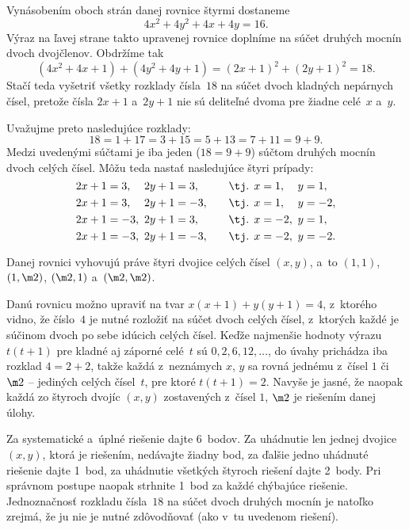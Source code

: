 {%
Vynásobením oboch strán danej rovnice štyrmi dostaneme
$$
4x^2+4y^2+4x+4y=16.
$$
Výraz na ľavej strane takto upravenej rovnice doplníme na súčet druhých
mocnín dvoch dvojčlenov. Obdržíme tak
$$
(4x^2+4x+1)+(4y^2+4y+1)=(2x+1)^2+(2y+1)^2=18.
$$
Stačí teda vyšetriť všetky rozklady čísla~$18$
na súčet dvoch kladných nepárnych čísel, pretože čísla $2x+1$ a~$2y+1$
nie sú deliteľné dvoma pre žiadne celé~$x$ a~$y$.

Uvažujme preto nasledujúce rozklady:
$$
18=1+17=3+15=5+13=7+11=9+9.
$$
Medzi uvedenými súčtami je iba jeden ($18=9+9$) súčtom druhých
mocnín dvoch celých čísel. Môžu teda nastať nasledujúce štyri prípady:
$$
\vcenter{\openup\jot\let\\=\cr
\halign{&$#$\hss\cr
2x+1=3, \enspace &2y+1=3,  \qquad&\text{\tj. }x=1, \enspace &y=1,\\
2x+1=3, \enspace &2y+1=-3, \qquad&\text{\tj. }x=1, \enspace &y=-2,\\
2x+1=-3,\enspace &2y+1=3,  \qquad&\text{\tj. }x=-2,\enspace &y=1,\\
2x+1=-3,\enspace &2y+1=-3, \qquad&\text{\tj. }x=-2,\enspace &y=-2.\\
}}
$$

\zaver
Danej rovnici vyhovujú práve štyri dvojice celých čísel $(x,y)$,
a~to $(1,1)$, $(1,\m2)$, $(\m2,1)$ a~$(\m2,\m2)$.

\ineriesenie
Danú rovnicu možno upraviť na tvar $x(x+1)+y(y+1)=4$, z~ktorého vidno, že číslo~$4$
je nutné rozložiť na súčet dvoch celých čísel, z~ktorých každé je
súčinom dvoch po sebe idúcich celých čísel.
Keďže najmenšie hodnoty výrazu $t(t+1)$ pre kladné aj záporné celé~$t$
sú $0, 2, 6, 12,\dots$, do úvahy prichádza iba rozklad $4=2+2$, takže každá
z~neznámych $x$, $y$ sa rovná jednému z~čísel $1$ či $\m2$ -- jediných celých
čísel~$t$, pre ktoré $t(t+1)=2$. Navyše je jasné, že naopak každá zo štyroch
dvojíc $(x,y)$ zostavených z~čísel $1$, $\m2$ je riešením danej úlohy.

\nobreak\medskip\petit\noindent
Za systematické a~úplné riešenie dajte 6~bodov. Za uhádnutie len jednej dvojice $(x,y)$, ktorá je riešením,
nedávajte žiadny bod, za ďalšie jedno uhádnuté riešenie dajte 1~bod, za uhádnutie všetkých
štyroch riešení dajte 2~body. Pri správnom postupe naopak strhnite 1~bod za každé
chýbajúce riešenie. Jednoznačnosť rozkladu čísla~$18$ na súčet dvoch druhých mocnín je natoľko
zrejmá, že ju nie je nutné zdôvodňovať (ako v~tu uvedenom riešení).
\endpetit
\bigbreak
}

